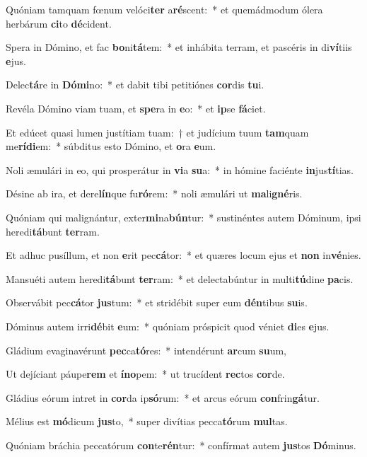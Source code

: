 \item Quóniam tamquam fœnum velóci\textbf{ter} a\textbf{ré}scent:~* et quemádmodum ólera herbárum \textbf{ci}to \textbf{dé}cident.
\item Spera in Dómino, et fac \textbf{bo}ni\textbf{tá}tem:~* et inhábita terram, et pascéris in di\textbf{ví}tiis \textbf{e}jus.
\item Delec\textbf{tá}re in \textbf{Dó}\textbf{mi}no:~* et dabit tibi petitiónes \textbf{cor}dis \textbf{tu}i.
\item Revéla Dómino viam tuam, et \textbf{spe}ra in \textbf{e}o:~* et \textbf{ip}se \textbf{fá}ciet.
\item Et edúcet quasi lumen justítiam tuam:~† et judícium tuum \textbf{tam}quam me\textbf{rí}\textbf{di}em:~* súbditus esto Dómino, et \textbf{o}ra \textbf{e}um.
\item Noli æmulári in eo, qui prosperátur in \textbf{vi}a \textbf{su}a:~* in hómine faciénte \textbf{in}jus\textbf{tí}tias.
\item Désine ab ira, et dere\textbf{lín}que fu\textbf{ró}rem:~* noli æmulári ut \textbf{ma}li\textbf{gné}ris.
\item Quóniam qui malignántur, exter\textbf{mi}na\textbf{bún}tur:~* sustinéntes autem Dóminum, ipsi heredi\textbf{tá}bunt \textbf{ter}ram.
\item Et adhuc pusíllum, et non \textbf{e}rit pec\textbf{cá}tor:~* et quæres locum ejus et \textbf{non} in\textbf{vé}nies.
\item Mansuéti autem heredi\textbf{tá}bunt \textbf{ter}ram:~* et delectabúntur in multi\textbf{tú}dine \textbf{pa}cis.
\item Observábit pec\textbf{cá}tor \textbf{jus}tum:~* et stridébit super eum \textbf{dén}tibus \textbf{su}is.
\item Dóminus autem irri\textbf{dé}bit \textbf{e}um:~* quóniam próspicit quod véniet \textbf{di}es \textbf{e}jus.
\item Gládium evaginavérunt \textbf{pec}ca\textbf{tó}res:~* intendérunt \textbf{ar}cum \textbf{su}um,
\item Ut dejíciant páupe\textbf{rem} et \textbf{ín}\textbf{o}pem:~* ut trucídent \textbf{rec}tos \textbf{cor}de.
\item Gládius eórum intret in \textbf{cor}da ip\textbf{só}rum:~* et arcus eórum \textbf{con}frin\textbf{gá}tur.
\item Mélius est \textbf{mó}dicum \textbf{jus}to,~* super divítias pecca\textbf{tó}rum \textbf{mul}tas.
\item Quóniam bráchia peccatórum \textbf{con}te\textbf{rén}tur:~* confírmat autem \textbf{jus}tos \textbf{Dó}minus.
